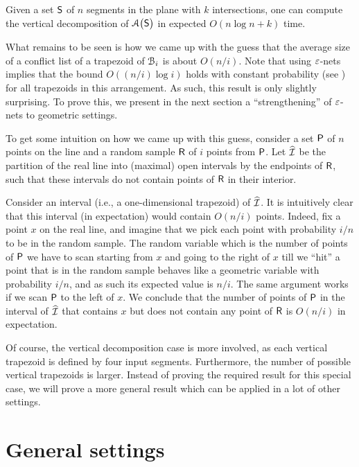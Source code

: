 \begin{theorem}
    Given a set $\mathsf{S}$ of $n$ segments in the plane with $k$
    intersections, one can compute the vertical decomposition of
    $\ArrX{\bigl. \SegSet }$ in expected $O(n \log{n} + k )$ time.
\end{theorem}

What remains to be seen is how we came up with the guess that the
average size of a conflict list of a trapezoid of $\EuScript{B}_i$ is about
$O(n/i)$.  Note that using ${\varepsilon}$-nets implies that the bound
$O((n/i)\log{i})$ holds with constant probability (see
) for all trapezoids in this arrangement. As
such, this result is only slightly surprising. To prove this, we
present in the next section a ``strengthening'' of ${\varepsilon}$-nets to
geometric settings.

To get some intuition on how we came up with this guess, consider a
set ${\mathsf{P}}$ of $n$ points on the line and a random sample
 $\mathsf{R}$ of $i$ points from ${\mathsf{P}}$. Let
$\widehat{\mathcal{I}}$ be the partition of the real line into (maximal) open
intervals by the endpoints of $\mathsf{R}$, such that these intervals do
not contain points of $\mathsf{R}$ in their interior.

Consider an interval (i.e., a one-dimensional trapezoid) of
$\widehat{\mathcal{I}}$.  It is intuitively clear that this interval (in
expectation) would contain $O(n/i)$ points. Indeed, fix a point $x$ on
the real line, and imagine that we pick each point with probability
$i/n$ to be in the random sample. The random variable which is the
number of points of ${\mathsf{P}}$ we have to scan starting from $x$ and
going to the right of $x$ till we ``hit'' a point that is in the
random sample behaves like a geometric variable with probability
$i/n$, and as such its expected value is $n/i$. The same argument
works if we scan ${\mathsf{P}}$ to the left of $x$. We conclude that the
number of points of ${\mathsf{P}}$ in the interval of $\widehat{\mathcal{I}}$ that
contains $x$ but does not contain any point of $\mathsf{R}$ is $O(n/i)$
in expectation.

Of course, the vertical decomposition case is more involved, as each
vertical trapezoid is defined by four input segments. Furthermore, the
number of possible vertical trapezoids is larger.  Instead of proving
the required result for this special case, we will prove a more
general result which can be applied in a lot of other settings.


\section{General settings}


